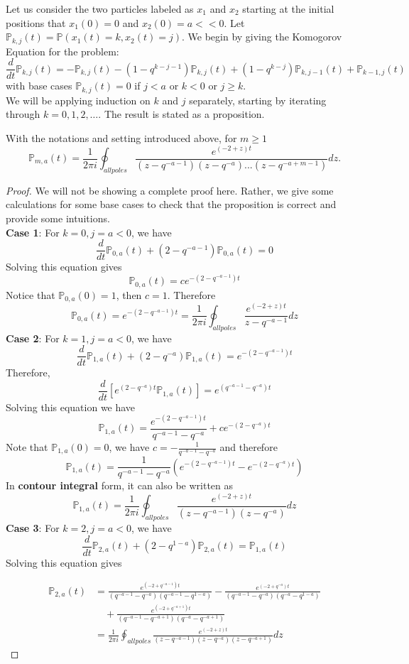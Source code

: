 Let us consider the two particles labeled as $x_1$ and $x_2$ starting at the initial positions that $x_1(0) = 0$ and $x_2(0) = a << 0$. Let $\mathbb{P}_{k,j}(t) = \mathbb{P}(x_1(t) = k, x_2(t) = j)$. We begin by giving the Komogorov Equation for the problem:
$$\frac{d}{dt} \mathbb{P}_{k,j}(t) = - \mathbb{P}_{k,j}(t) - (1-q^{k-j-1})\mathbb{P}_{k,j}(t) + (1-q^{k-j})\mathbb{P}_{k,j-1}(t) + \mathbb{P}_{k-1,j}(t)$$
with base cases  $\mathbb{P}_{k,j}(t) = 0$ if $j < a$ or $k < 0$ or $j \ge k$.\\
We will be applying induction on $k$ and $j$ separately, starting by iterating through $k = 0, 1, 2, \dots$. The result is stated as a proposition.
\begin{proposition}
With the notations and setting introduced above, for $m \ge 1$
 $$ \mathbb{P}_{m,a}(t) =\frac{1}{2 \pi i} \oint_{all poles} \frac{e^{(-2+z)t}}{(z-q^{-a-1})(z-q^{-a})...(z-q^{-a+m-1})} dz.$$
\end{proposition}
\begin{proof}
We will not be showing a complete proof here. Rather, we give some calculations for some base cases to check that the proposition is correct and provide some intuitions. \\
\textbf{Case 1}: For $k=0,j=a<0$, we have $$\frac{d}{dt} \mathbb{P}_{0,a}(t) + (2-q^{-a-1}) \mathbb{P}_{0,a}(t) = 0$$
 Solving this equation gives $$\mathbb{P}_{0,a}(t) = c e^{-(2-q^{-a-1})t}$$
 Notice that $\mathbb{P}_{0,a}(0) = 1$, then $c=1$. Therefore $$\mathbb{P}_{0,a}(t) = e^{-(2-q^{-a-1})t} = \frac{1}{2 \pi i} \oint_{all poles} \frac{e^{(-2+z)t}}{z-q^{-a-1}} dz$$
 \textbf{Case 2}: For $k=1, j=a<0$, we have $$\frac{d}{dt} \mathbb{P}_{1,a}(t) + (2-q^{-a}) \mathbb{P}_{1,a}(t) = e^{-(2-q^{-a-1})t}$$
 Therefore, $$\frac{d}{dt} [e^{(2-q^{-a})t} \mathbb{P}_{1,a}(t)] = e^{(q^{-a-1} - q^{-a})t}$$
 Solving this equation we have $$ \mathbb{P}_{1,a}(t) = \frac{e^{-(2-q^{-a-1})t}}{q^{-a-1} - q^{-a}} + c e^{-(2-q^{-a})t}$$
 Note that $\mathbb{P}_{1,a}(0) = 0$, we have $c = -\frac{1}{q^{-a-1} - q^{-a}}$ and therefore $$\mathbb{P}_{1,a}(t) = \frac{1}{q^{-a-1} - q^{-a}} (e^{-(2-q^{-a-1})t} - e^{-(2-q^{-a})t})$$
 In \textbf{contour integral} form, it can also be written as $$\mathbb{P}_{1,a}(t) =\frac{1}{2 \pi i} \oint_{all poles} \frac{e^{(-2+z)t}}{(z-q^{-a-1})(z-q^{-a})} dz$$
 \textbf{Case 3}: For $k=2, j=a<0$, we have $$\frac{d}{dt} \mathbb{P}_{2,a}(t) + (2-q^{1-a}) \mathbb{P}_{2,a}(t) = \mathbb{P}_{1,a}(t)$$
 Solving this equation gives 

 \begin{align*}
  \mathbb{P}_{2,a}(t) &= \frac{e^{(-2+q^{-a-1})t}}{ (q^{-a-1} - q^{-a})(q^{-a-1} - q^{1-a}) } - \frac{ e^{(-2+q^{-a})t} }{ (q^{-a-1} - q^{-a}) (q^{-a} - q^{1-a}) }\\
  & \quad + \frac{e^{(-2+q^{-a+1})t}}{ (q^{-a-1} - q^{-a+1})(q^{-a} - q^{-a+1}) } \\
  &=\frac{1}{2 \pi i} \oint_{all poles} \frac{e^{(-2+z)t}}{(z-q^{-a-1})(z-q^{-a})(z-q^{-a+1})} dz
 \end{align*}
\end{proof}
